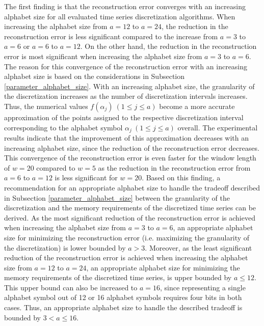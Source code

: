 The first finding is that the reconstruction error converges with an increasing alphabet size for all evaluated time series discretization algorithms. When increasing the alphabet size from $a = 12$ to $a = 24$, the reduction in the reconstruction error is less significant compared to the increase from $a = 3$ to $a = 6$ or $a = 6$ to $a = 12$. On the other hand, the reduction in the reconstruction error is most significant when increasing the alphabet size from $a = 3$ to $a = 6$. The reason for this convergence of the reconstruction error with an increasing alphabet size is based on the considerations in Subsection \ref{parameter_alphabet_size}. With an increasing alphabet size, the granularity of the discretization increases as the number of discretization intervals increases. Thus, the numerical values $f(\alpha_j) \ (1 \leq j \leq a)$ become a more accurate approximation of the points assigned to the respective discretization interval corresponding to the alphabet symbol $\alpha_j \ (1 \leq j \leq a)$ overall. The experimental results indicate that the improvement of this approximation decreases with an increasing alphabet size, since the reduction of the reconstruction error decreases. This convergence of the reconstruction error is even faster for the window length of $w = 20$ compared to $w = 5$ as the reduction in the reconstruction error from $a = 6$ to $a = 12$ is less significant for $w = 20$. \newline
Based on this finding, a recommendation for an appropriate alphabet size to handle the tradeoff described in Subsection \ref{parameter_alphabet_size} between the granularity of the discretization and the memory requirements of the discretized time series can be derived. As the most significant reduction of the reconstruction error is achieved when increasing the alphabet size from $a = 3$ to $a = 6$, an appropriate alphabet size for minimizing the reconstruction error (i.e. maximizing the granularity of the discretization) is lower bounded by $a > 3$. Moreover, as the least significant reduction of the reconstruction error is achieved when increasing the alphabet size from $a = 12$ to $a = 24$, an appropriate alphabet size for minimizing the memory requirements of the discretized time series, is upper bounded by $a \leq 12$. This upper bound can also be increased to $a = 16$, since representing a single alphabet symbol out of 12 or 16 alphabet symbols requires four bits in both cases. Thus, an appropriate alphabet size to handle the described tradeoff is bounded by $3 < a \leq 16$. \newline
